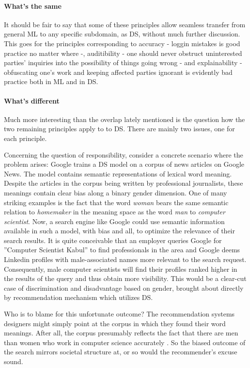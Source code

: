\documentclass{article}
\begin{document}
\paragraph{What's the same}
It should be fair to say that some of these principles allow seamless transfer from general ML to any specific subdomain, as DS, without much further discussion.
This goes for the principles corresponding to accuracy - loggin mistakes is good practice no matter where -, auditibility - one should never obstruct uninterested parties' inquiries into the possibility of things going wrong - and explainability - obfuscating one's work and keeping affected parties ignorant is evidently bad practice both in ML and in DS.

\paragraph{What's different}
Much more interesting than the overlap lately mentioned is the question how the two remaining principles apply to to DS.
There are mainly two issues, one for each principle. 

Concerning the question of responsibility, consider a concrete scenario where the problem arises: Google trains a DS model on a corpus of news articles on Google News. The model contains semantic representations of lexical word meaning. Despite the articles in the corpus being written by professional journalists, these meanings contain clear bias along a binary gender dimension. One of many striking examples is the fact that the word \emph{woman} bears the same semantic relation to \emph{homemaker} in the meaning space as the word \emph{man} to \emph{computer scientist}. Now, a search engine like Google could use semantic information available in such a model, with bias and all, to optimize the relevance of their search results. It is quite conceivable that an employer queries Google for ''Computer Scientist Kabul'' to find professionals in the area and Google deems Linkedin profiles with male-associated names more relevant to the search request. Consequently, male computer scientists will find their profiles ranked higher in the results of the query and thus obtain more visibility. This would be a clear-cut case of discrimination and disadvantage based on gender, brought about directly by recommendation mechanism which utilizes DS.

Who is to blame for this unfortunate outcome? The recommendation systems designers might simply point at the corpus in which they found their word meanings. After all, the corpus presumably reflects the fact that there are men than women who work in computer science accurately \cite{womenincs}. So the biased outcome of the search mirrors societal structure at, or so would the recommender's excuse sound. 
\end{document}

